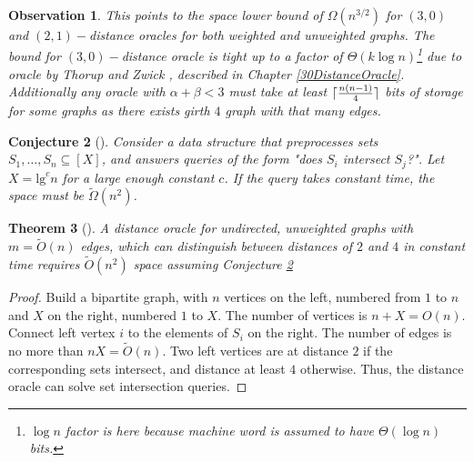 \documentclass[shortabstract, lic, english]{iithesis}
\theoremstyle{definition} \newtheorem{definition}{Definition}[chapter]
\theoremstyle{plain} \newtheorem{remark}[definition]{Observation}
\theoremstyle{plain} \newtheorem{theorem}[definition]{Theorem}
\theoremstyle{plain} \newtheorem{lemma}[definition]{Lemma}
\theoremstyle{plain} \newtheorem{conjecture}[definition]{Conjecture}
\DeclarePairedDelimiter{\ceil}{\lceil}{\rceil}
\begin{document}
\begin{remark}
    This points to the space lower bound of $\Omega(n^{3/2})$ for $(3,0)$ and $(2,1)-$distance oracles for both weighted and unweighted graphs.
    The bound for $(3, 0)-$distance oracle is tight up to a factor of $\Theta(k \log n)$\footnote{$\log n$ factor is here because machine word is assumed to have $\Theta(\log n)$ bits.}
    due to oracle by Thorup and Zwick \cite{a0OraclesBasic}, described in Chapter \ref{30DistanceOracle}.
    Additionally any oracle with $\alpha + \beta < 3$ must take at least $\ceil{\frac{n(n-1)}{4}}$ bits of storage for some graphs as there exists girth $4$ graph with that many edges.
\end{remark}

\begin{conjecture}[\cite{21OracleLessMemory}] \label{setIntersectionQueries}
    Consider a data structure that preprocesses sets $S_1, \ldots, S_n \subseteq [X]$, and answers queries of the form "does $S_i$ intersect $S_j$?".
    Let $X = \text{lg}^c n$ for a large enough constant $c$.
    If the query takes constant time, the space must be $\tilde{\Omega}(n^2)$.
\end{conjecture}

\begin{theorem}[\cite{21OracleLessMemory}] \label{alphaAbove2}
    A distance oracle for undirected, unweighted graphs with $m = \tilde{O}(n)$ edges, which can distinguish between distances of $2$ and $4$ in constant time
    requires $\tilde{O}(n^2)$ space assuming Conjecture \ref{setIntersectionQueries}
\end{theorem}

\begin{proof}
    Build a bipartite graph, with $n$ vertices on the left, numbered from $1$ to $n$ and $X$ on the right, numbered $1$ to $X$. The number of vertices
    is $n + X = O(n)$. Connect left vertex $i$ to the elements of $S_i$ on the right. The number of edges is no more than $nX = \tilde{O}(n)$.
    Two left vertices are at distance $2$ if the corresponding sets intersect, and distance at least $4$ otherwise.
    Thus, the distance oracle can solve set intersection queries.
\end{proof}
\end{document}
